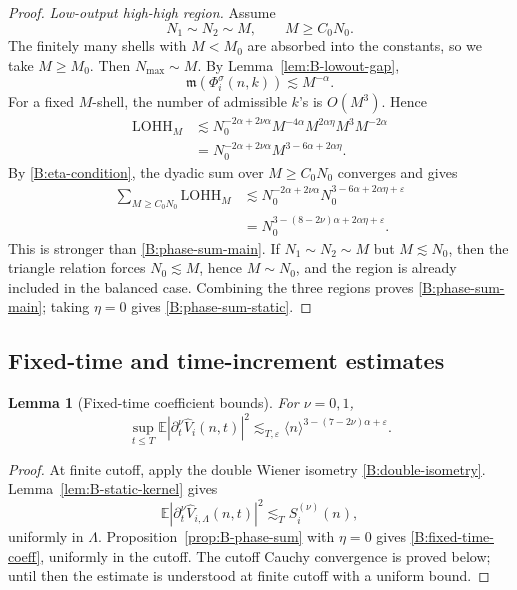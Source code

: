 \documentclass[10pt]{amsart}
\numberwithin{equation}{section}
\theoremstyle{plain}
\newtheorem{lemma}[theorem]{Lemma}
\theoremstyle{definition}
\theoremstyle{remark}
\newcommand{\E}{\mathbb{E}}
\newcommand{\eps}{\varepsilon}
\newcommand{\la}{\langle}
\newcommand{\ra}{\rangle}
\newcommand{\frakm}{\mathfrak{m}}
\begin{document}
\begin{proof}
\emph{Low-output high-high region.}  Assume
\[
        N_1\sim N_2\sim M,
        \qquad
        M\ge C_0N_0.
\]
The finitely many shells with \(M<M_0\) are absorbed into the constants, so we take \(M\ge M_0\).  Then \(N_{\max}\sim M\).  By Lemma~\ref{lem:B-lowout-gap},
\[
        \frakm(\Phi_i^\sigma(n,k))\lesssim M^{-\alpha}.
\]
For a fixed \(M\)-shell, the number of admissible \(k\)'s is \(O(M^3)\).  Hence
\[
\begin{aligned}
        \mathrm{LOHH}_M
        &\lesssim
        N_0^{-2\alpha+2\nu\alpha}M^{-4\alpha}M^{2\alpha\eta}M^3M^{-2\alpha} \\
        &=
        N_0^{-2\alpha+2\nu\alpha}M^{3-6\alpha+2\alpha\eta}.
\end{aligned}
\]
By \eqref{B:eta-condition}, the dyadic sum over \(M\ge C_0N_0\) converges and gives
\[
\begin{aligned}
        \sum_{M\ge C_0N_0}\mathrm{LOHH}_M
        &\lesssim
        N_0^{-2\alpha+2\nu\alpha}N_0^{3-6\alpha+2\alpha\eta+\eps} \\
        &=
        N_0^{3-(8-2\nu)\alpha+2\alpha\eta+\eps}.
\end{aligned}
\]
This is stronger than \eqref{B:phase-sum-main}.  If \(N_1\sim N_2\sim M\) but \(M\lesssim N_0\), then the triangle relation forces \(N_0\lesssim M\), hence \(M\sim N_0\), and the region is already included in the balanced case.  Combining the three regions proves \eqref{B:phase-sum-main}; taking \(\eta=0\) gives \eqref{B:phase-sum-static}.
\end{proof}



\subsection{Fixed-time and time-increment estimates}

\begin{lemma}[Fixed-time coefficient bounds]\label{lem:B-fixed-time}
For \(\nu=0,1\),
\begin{equation}\label{B:fixed-time-coeff}
        \sup_{t\le T}\E\left|\partial_t^\nu\widehat V_i(n,t)\right|^2
        \lesssim_{T,\eps}
        \la n\ra^{3-(7-2\nu)\alpha+\eps}.
\end{equation}
\end{lemma}

\begin{proof}
At finite cutoff, apply the double Wiener isometry \eqref{B:double-isometry}.  Lemma~\ref{lem:B-static-kernel} gives
\[
        \E\left|\partial_t^\nu\widehat V_{i,\Lambda}(n,t)\right|^2
        \lesssim_T S_i^{(\nu)}(n),
\]
uniformly in \(\Lambda\).  Proposition~\ref{prop:B-phase-sum} with \(\eta=0\) gives \eqref{B:fixed-time-coeff}, uniformly in the cutoff.  The cutoff Cauchy convergence is proved below; until then the estimate is understood at finite cutoff with a uniform bound.
\end{proof}
\end{document}
